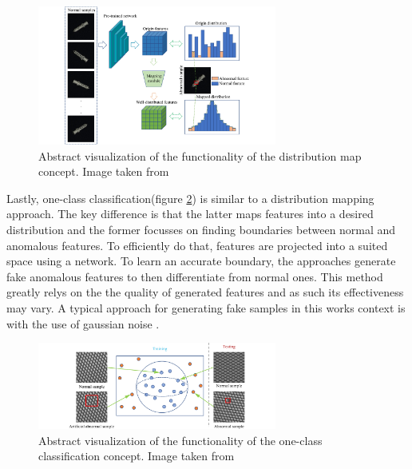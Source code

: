 \begin{figure}[H]
    \centering
    \includegraphics[width=0.7\textwidth]{figures/approachvizgeneral/distmapviz.jpg}
    \caption{Abstract visualization of the functionality of the distribution map concept. Image taken from \cite{liu2024deep}}
    \label{fig:distmapviz}
\end{figure}

Lastly, one-class classification(figure \ref{fig:OCCviz}) is 
similar to a distribution mapping approach. The key difference is that the latter maps features into a desired distribution and the former focusses on finding boundaries between normal 
and anomalous features. To efficiently do that, features are projected into a suited space using a network. To learn an accurate boundary, the approaches generate fake anomalous features to 
then differentiate from normal ones. This method greatly relys on the the quality of generated features and as such its effectiveness may vary. A typical approach for generating fake samples 
in this works context is with the use of gaussian noise \cite{liu2023simplenet}.

\begin{figure}[H]
    \centering
    \includegraphics[width=0.7\textwidth]{figures/approachvizgeneral/OCCviz.jpg}
    \caption{Abstract visualization of the functionality of the one-class classification concept. Image taken from \cite{liu2024deep}}
    \label{fig:OCCviz}
\end{figure}


